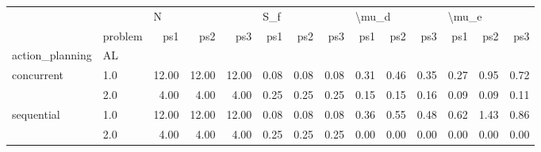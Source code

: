 \begin{tabular}{llrrrrrrrrrrrr}
\toprule
           & {} & \multicolumn{3}{l}{N} & \multicolumn{3}{l}{S\_f} & \multicolumn{3}{l}{\textbackslash mu\_d} & \multicolumn{3}{l}{\textbackslash mu\_e} \\
           & problem &   ps1 &   ps2 &   ps3 &  ps1 &  ps2 &  ps3 &   ps1 &  ps2 &  ps3 &   ps1 &  ps2 &  ps3 \\
action\_planning & AL &       &       &       &      &      &      &       &      &      &       &      &      \\
\midrule
concurrent & 1.0 & 12.00 & 12.00 & 12.00 & 0.08 & 0.08 & 0.08 &  0.31 & 0.46 & 0.35 &  0.27 & 0.95 & 0.72 \\
           & 2.0 &  4.00 &  4.00 &  4.00 & 0.25 & 0.25 & 0.25 &  0.15 & 0.15 & 0.16 &  0.09 & 0.09 & 0.11 \\
sequential & 1.0 & 12.00 & 12.00 & 12.00 & 0.08 & 0.08 & 0.08 &  0.36 & 0.55 & 0.48 &  0.62 & 1.43 & 0.86 \\
           & 2.0 &  4.00 &  4.00 &  4.00 & 0.25 & 0.25 & 0.25 &  0.00 & 0.00 & 0.00 &  0.00 & 0.00 & 0.00 \\
\bottomrule
\end{tabular}

